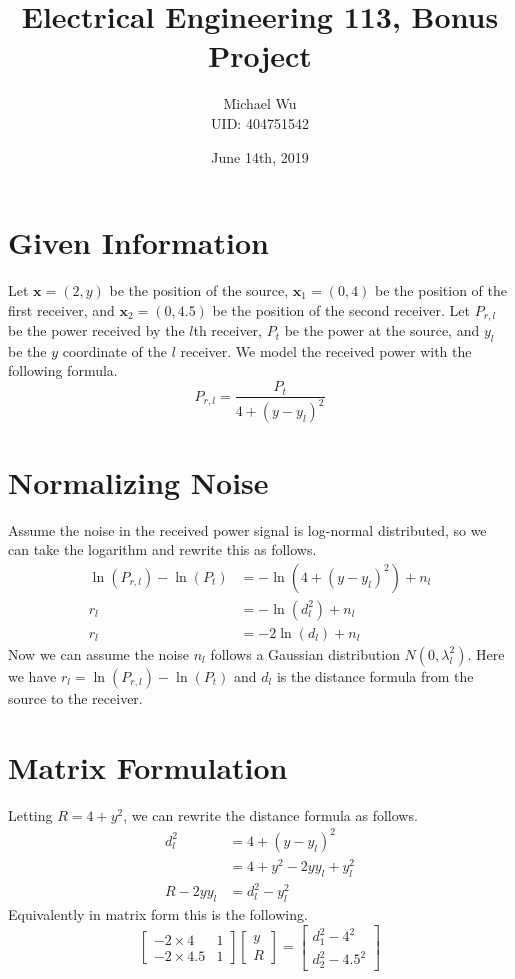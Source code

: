 \documentclass[12pt]{article}
\begin{document}
\title{Electrical Engineering 113, Bonus Project}
\date{June 14th, 2019}
\author{Michael Wu\\UID: 404751542}
\maketitle

\section{Given Information}

Let \(\mathbf{x} = (2,y)\) be the position of the source, \(\mathbf{x}_1 = (0,4)\)
be the position of the first receiver, and \(\mathbf{x}_2 = (0,4.5)\) be the position
of the second receiver. Let \(P_{r,l}\) be the power received by the \(l\)th receiver,
\(P_t\) be the power at the source, and \(y_l\) be the \(y\) coordinate of the \(l\)
receiver. We model the received power with the following formula.
\[P_{r,l}=\frac{P_t}{4 + (y-y_l)^2}\]

\section{Normalizing Noise}

Assume the noise in the received power signal is log-normal distributed, so we can take the logarithm
and rewrite this as follows.
\begin{align*}
    \ln(P_{r,l})-\ln(P_t)&=-\ln\left(4 + (y-y_l)^2\right) + n_l\\
    r_l&=-\ln(d_l^2) + n_l\\
    r_l&=-2\ln(d_l) + n_l
\end{align*}
Now we can assume the noise \(n_l\) follows a Gaussian distribution \(N(0,\lambda_l^2)\).
Here we have \(r_l=\ln(P_{r,l})-\ln(P_t)\) and \(d_l\) is the distance formula from the
source to the receiver.

\section{Matrix Formulation}

Letting \(R=4+y^2\), we can rewrite the distance formula as follows.
\begin{align*}
    d_l^2&=4 + (y-y_l)^2\\
    &=4 + y^2 - 2yy_l + y_l^2\\
    R - 2yy_l&=d_l^2-y_l^2
\end{align*}
Equivalently in matrix form this is the following.
\[\begin{bmatrix}-2\times4 & 1\\-2\times4.5 & 1\end{bmatrix}\begin{bmatrix}y\\R\end{bmatrix}
=\begin{bmatrix}d_1^2-4^2\\d_2^2-4.5^2\end{bmatrix}\]
\end{document}
